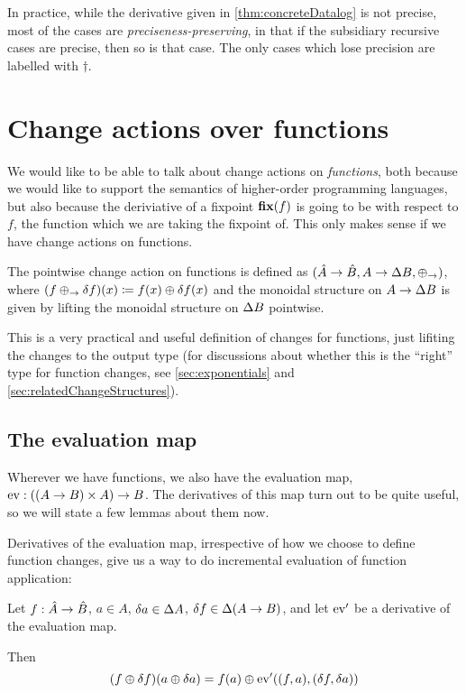 In practice, while the derivative given in \cref{thm:concreteDatalog} is not
precise, most of the cases are \emph{preciseness-preserving}, in that if the
subsidiary recursive cases are precise, then so is that case. The only cases
which lose precision are labelled with $\dagger$.

\section{Change actions over functions}

We would like to be able to talk about change actions on \emph{functions}, both
because we would like to support the semantics of higher-order programming
languages, but also because the deriviative of a fixpoint $\mathbf{fix}(f)$ is going to be with
respect to $f$, the function which we are taking the fixpoint of. This only
makes sense if we have change actions on functions.

\begin{defn}
  \label{def:pointwiseChanges}
  The pointwise change action on functions is defined as
  $(\hat{A} \rightarrow \hat{B},A \rightarrow \Delta B,\oplus_\rightarrow)$,
  where $(f \oplus_\rightarrow \delta f)(x) \coloneqq f(x) \oplus \delta f(x)$ and the
  monoidal structure on $A \rightarrow \Delta B$ is given by lifting
  the monoidal structure on $\Delta B$ pointwise.
\end{defn}

This is a very practical and useful definition of changes for functions, just
lifiting the changes to the output type (for discussions about whether this is
the ``right'' type for function changes, see \cref{sec:exponentials} and \cref{sec:relatedChangeStructures}).

\subsection{The evaluation map}
\label{sec:evaluationMap}

Wherever we have functions, we also have the evaluation map, $\operatorname{ev}: ((A
\rightarrow B) \times A) \rightarrow B$. The derivatives of this map turn out to be
quite useful, so we will state a few lemmas about them now.

Derivatives of the evaluation map, irrespective of how we choose to define
function changes, give us a way to do incremental evaluation of function application:
\begin{prop}
\label{prop:incrementalization}
  Let $f: \hat{A} \rightarrow \hat{B}$, $a \in A$, $\delta a \in
  \Delta A$, $\delta f \in \Delta (A \rightarrow B)$, and let
  $\operatorname{ev}'$ be a derivative of the evaluation map.

  Then
  \begin{displaymath}
    (f \oplus \delta f)(a \oplus \delta a) = f(a) \oplus \operatorname{ev}'((f, a), (\delta f, \delta a))
  \end{displaymath}
\end{prop}


